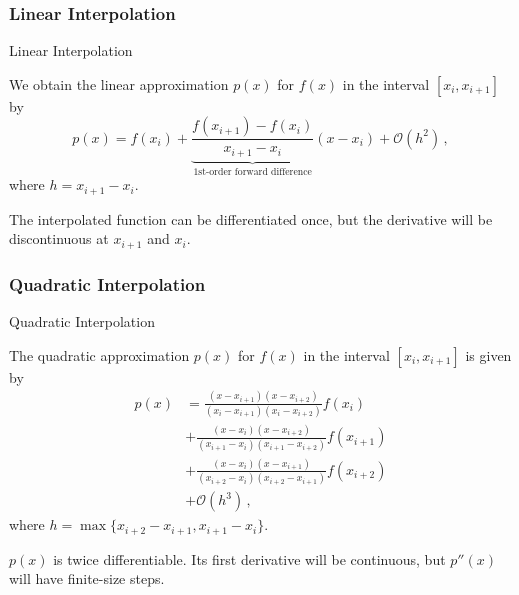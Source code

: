 \documentclass[11pt]{beamer}
\begin{document}
\subsubsection{Linear Interpolation}
\begin{frame}[fragile]{Linear Interpolation}

We obtain the linear approximation $p(x)$ for $f(x)$ in the interval
$[x_i,x_{i+1}]$ by 
\begin{equation}
\label{eq:linterp}
p(x) = f(x_i) +\!\!\! \underbrace{\frac{f(x_{i+1}) - f(x_i)}{x_{i+1} -
    x_i}}_\text{1st-order forward difference}\!\!\! (x-x_i) +
\mathcal{O}(h^2)\,,
\end{equation}
where $h = x_{i+1} - x_i$. \\
\bigskip
\pause

The interpolated function can be differentiated once, but
the derivative will be discontinuous at $x_{i+1}$ and
$x_i$.
\end{frame}


\subsubsection{Quadratic Interpolation}
\begin{frame}[fragile]{Quadratic Interpolation}

The quadratic approximation $p(x)$ for $f(x)$ in the interval
$[x_{i},x_{i+1}]$ is given by
\begin{equation}
\begin{aligned}
p(x) &= \frac{(x-x_{i+1})(x-x_{i+2})}{(x_i - x_{i+1})(x_i - x_{i+2})} f(x_i)\\
&+ \frac{(x-x_{i})(x-x_{i+2})}{(x_{i+1} - x_{i})(x_{i+1} - x_{i+2})} f(x_{i+1})\\
&+ \frac{(x-x_i)(x-x_{i+1})}{(x_{i+2} - x_i)(x_{i+2} - x_{i+1})} f(x_{i+2})\\
&+ \mathcal{O}(h^3)\,,
\end{aligned}
\end{equation}
where $h = \max\{x_{i+2}-x_{i+1},x_{i+1}-x_i\}$.\\

\pause
\bigskip

$p(x)$ is twice differentiable. Its first derivative will be continuous,
but $p''(x)$ will have finite-size steps.
\end{frame}
\end{document}
